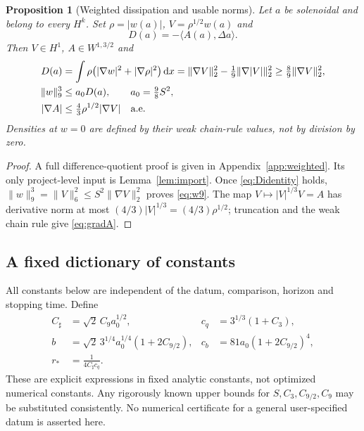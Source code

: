 \documentclass[11pt,a4paper]{article}
\newtheorem{proposition}[theorem]{Proposition}
\theoremstyle{definition}\newtheorem{definition}[theorem]{Definition}
\theoremstyle{remark}\newtheorem{remark}[theorem]{Remark}
\newcommand{\dd}{\,\mathrm d}
\newcommand{\norm}[1]{\lVert #1\rVert}
\newcommand{\ip}[2]{\langle #1,#2\rangle}
\newcommand{\rstar}{r_*}
\newcommand{\Cstar}{C_\sharp}
\newcommand{\cb}{c_b}
\numberwithin{equation}{section}
\begin{document}
\begin{proposition}[Weighted dissipation and usable norms]\label{prop:weighted}
Let $a$ be solenoidal and belong to every $H^k$. Set $\rho=|w(a)|$, $V=\rho^{1/2}w(a)$ and
\begin{equation}\label{eq:D}
 D(a)=-\ip{A(a)}{\Delta a}.
\end{equation}
Then $V\in H^1$, $A\in W^{1,3/2}$ and
\begin{align}
 D(a)&=\int\rho\bigl(|\nabla w|^2+|\nabla\rho|^2\bigr)\dd x
 =\norm{\nabla V}_2^2-\tfrac19\norm{\nabla|V|}_2^2
 \ge\tfrac89\norm{\nabla V}_2^2,\label{eq:Didentity}\\
 \norm w_9^3&\le a_0D(a),\qquad a_0=\tfrac98S^2,\label{eq:w9}\\
 |\nabla A|&\le\tfrac43\rho^{1/2}|\nabla V|\quad\hbox{a.e.}\label{eq:gradA}
\end{align}
Densities at $w=0$ are defined by their weak chain-rule values, not by division by zero.
\end{proposition}
\begin{proof}
A full difference-quotient proof is given in Appendix~\ref{app:weighted}. Its only project-level input is Lemma~\ref{lem:import}. Once \eqref{eq:Didentity} holds, $\norm w_9^3=\norm V_6^2\le S^2\norm{\nabla V}_2^2$ proves \eqref{eq:w9}. The map $V\mapsto |V|^{1/3}V=A$ has derivative norm at most $(4/3)|V|^{1/3}=(4/3)\rho^{1/2}$; truncation and the weak chain rule give \eqref{eq:gradA}.
\end{proof}

\subsection{A fixed dictionary of constants}
All constants below are independent of the datum, comparison, horizon and stopping time. Define
\begin{align}
 \Cstar&=\sqrt2\,C_9a_0^{1/2},&
 c_q&=3^{1/3}(1+C_3),\label{eq:constants1}\\
 b&=\sqrt2\,3^{1/4}a_0^{1/4}(1+2C_{9/2}),&
 \cb&=81a_0(1+2C_{9/2})^4,\label{eq:constants2}\\
 \rstar&=\frac1{4\Cstar c_q}.&&\label{eq:rstar}
\end{align}
These are explicit expressions in fixed analytic constants, not optimized numerical constants. Any rigorously known upper bounds for $S,C_3,C_{9/2},C_9$ may be substituted consistently. No numerical certificate for a general user-specified datum is asserted here.
\end{document}
